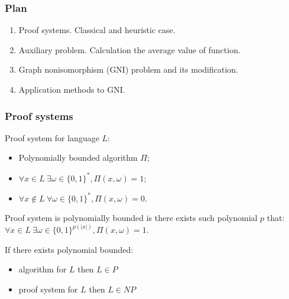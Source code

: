 \begin{frame}
    \frametitle{Plan}

    \begin{enumerate}
	    \item Proof systems. Classical and heuristic case.
    	\item Auxiliary problem. Calculation the average value of function.
    	\item Graph nonisomorphism (GNI) problem and its modification.
    	\item Application methods to GNI.
    \end{enumerate}
\end{frame}

\begin{frame}
	\frametitle{Proof systems}

    \begin{definition}
        Proof system for language $L$:
        \begin{itemize}
            \item Polynomially bounded algorithm $\Pi$;
            \item $\forall x \in L~ \exists \omega \in \{0, 1\}^{*}, \Pi(x, \omega) = 1$;
        	\item $\forall x \notin L~ \forall \omega \in \{0, 1\}^{*}, 
        		\Pi(x, \omega) = 0$.
        \end{itemize}
    \end{definition}

    Proof system is polynomially bounded is there exists such polynomial $p$ that:
    $\forall x \in L~ \exists \omega \in \{0, 1\}^{p(|x|)}, \Pi(x, \omega) = 1$.


    If there exists polynomial bounded:
    \begin{itemize}
        \item algorithm for $L$ then $L \in P$
	    \item proof system for $L$ then $L \in NP$
    \end{itemize}

\end{frame}


